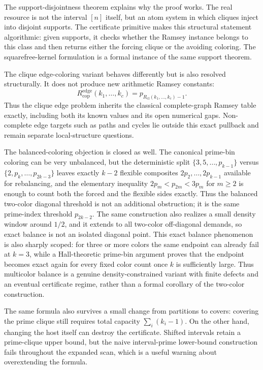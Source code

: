 \documentclass[11pt]{article}
\theoremstyle{plain}
\theoremstyle{definition}
\theoremstyle{remark}
\newcommand{\Redge}{R_{\mathrm{cop}}^{\mathrm{edge}}}
\newcommand{\Rcl}{R_{\mathrm{cl}}}
\begin{document}
The support-disjointness theorem explains why the proof works.  The real
resource is not the interval $[n]$ itself, but an atom system in which cliques
inject into disjoint supports.  The certificate primitive makes this
structural statement algorithmic: given supports, it checks whether the
Ramsey instance belongs to this class and then returns either the forcing
clique or the avoiding coloring.  The squarefree-kernel formulation is a
formal instance of the same support theorem.

The clique edge-coloring variant behaves differently but is also resolved
structurally.  It does not produce new arithmetic Ramsey constants:
\[
  \Redge(k_1,\ldots,k_c)=p_{\Rcl(k_1,\ldots,k_c)-1}.
\]
Thus the clique edge problem inherits the classical complete-graph Ramsey
table exactly, including both its known values and its open numerical gaps.
Non-complete edge targets such as paths and cycles lie outside this exact
pullback and remain separate local-structure questions.

The balanced-coloring objection is closed as well.  The canonical prime-bin
coloring can be very unbalanced, but the deterministic split
$\{3,5,\ldots,p_{k-1}\}$ versus $\{2,p_k,\ldots,p_{2k-3}\}$ leaves exactly
$k-2$ flexible composites $2p_2,\ldots,2p_{k-1}$ available for rebalancing,
and the elementary inequality $2p_m<p_{2m}<3p_m$ for $m\ge2$ is enough to
count both the forced and the flexible sides exactly.  Thus the balanced
two-color diagonal threshold is not an additional obstruction; it is the
same prime-index threshold $p_{2k-2}$.  The same construction also realizes a
small density window around $1/2$, and it extends to all two-color
off-diagonal demands, so exact balance is not an isolated diagonal point.
This exact balance phenomenon is also sharply scoped: for three or more
colors the same endpoint can already fail at $k=3$, while a Hall-theoretic
prime-bin argument proves that the endpoint becomes exact again for every
fixed color count once $k$ is sufficiently large.  Thus multicolor balance is a
genuine density-constrained variant with finite defects and an eventual
certificate regime, rather than a formal corollary of the two-color
construction.

The same formula also survives a small change from partitions to covers:
covering the prime clique still requires total capacity
\(\sum_i(k_i-1)\).  On the other hand, changing the host itself can destroy
the certificate.  Shifted intervals retain a prime-clique upper bound, but the
naive interval-prime lower-bound construction fails throughout the expanded
scan, which is a useful warning about overextending the formula.
\end{document}
